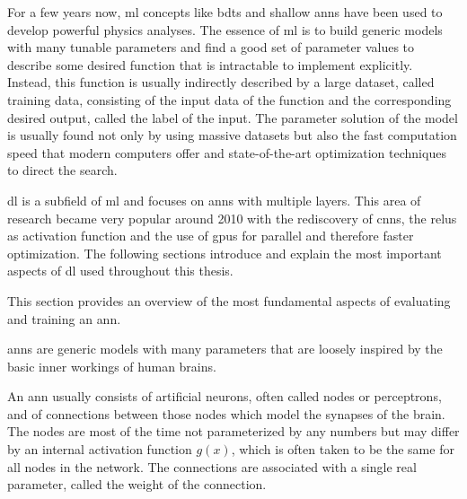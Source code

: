 
\label{sec:deeplearning}

For a few years now, \gls{ml} concepts like \glspl{bdt} and shallow \glspl{ann} have been used to develop powerful physics analyses. The essence of \gls{ml} is to build generic models with many tunable parameters and find a good set of parameter values to describe some desired function that is intractable to implement explicitly. Instead, this function is usually indirectly described by a large dataset, called training data, consisting of the input data of the function and the corresponding desired output, called the label of the input. The parameter solution of the model is usually found not only by using massive datasets but also the fast computation speed that modern computers offer and state-of-the-art optimization techniques to direct the search.

\gls{dl} is a subfield of \gls{ml} and focuses on \glspl{ann} with multiple layers. This area of research became very popular around 2010 with the rediscovery of \glspl{cnn}, the \glspl{relu} as activation function and the use of \glspl{gpu} for parallel and therefore faster optimization. The following sections introduce and explain the most important aspects of \gls{dl} used throughout this thesis.


This section provides an overview of the most fundamental aspects of evaluating and training an \gls{ann}.

\glspl{ann} are generic models with many parameters that are loosely inspired by the basic inner workings of human brains.

An \gls{ann} usually consists of artificial neurons, often called nodes or perceptrons, and of connections between those nodes which model the synapses of the brain. The nodes are most of the time not parameterized by any numbers but may differ by an internal activation function \(g(x)\), which is often taken to be the same for all nodes in the network. The connections are associated with a single real parameter, called the weight of the connection.

